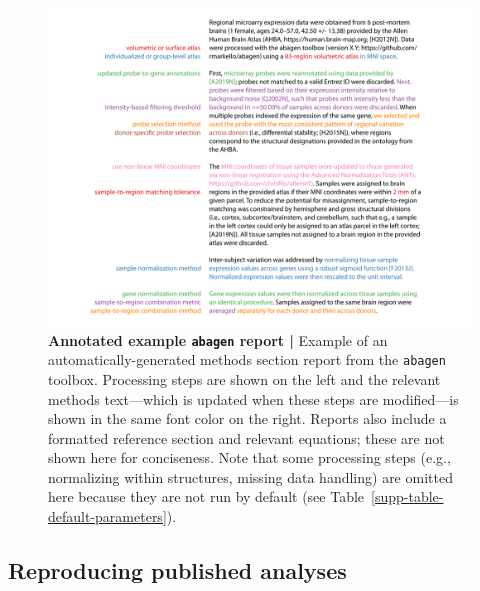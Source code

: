 \documentclass[12pt,aps,pra,reprint,showkeys]{revtex4-1}
\begin{document}
\begin{figure}[htp]
  \begin{center}
    \centerline{\includegraphics[width=\textwidth]{example_report.png}}
    \caption{
      \textbf{Annotated example \texttt{abagen} report |}
      Example of an automatically-generated methods section report from the \texttt{abagen} toolbox.
      Processing steps are shown on the left and the relevant methods text---which is updated when these steps are modified---is shown in the same font color on the right.
      Reports also include a formatted reference section and relevant equations; these are not shown here for conciseness.
      Note that some processing steps (e.g., normalizing within structures, missing data handling) are omitted here because they are not run by default (see Table~\ref{supp-table-default-parameters}).
      }
    \label{supp-figure-example-report}
  \end{center}
\end{figure}

\subsection*{Reproducing published analyses}
\end{document}
